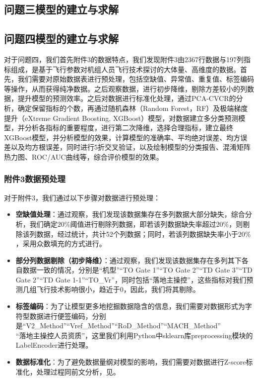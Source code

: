\documentclass{MathorCupModeling}
\begin{document}
	\subsection{问题三模型的建立与求解}

	\subsection{问题四模型的建立与求解}
	对于问题四，我们首先附件3的数据特点，我们发现附件3由2367行数据与197列指标组成，是基于飞行参数对机组人员飞行技术探讨的大体量、高维度的数据。首先，我们需要对原始数据表进行预处理，包括空缺值、异常值、重复值、标签编码等操作，从而获得纯净数据。之后观察数据，进行初步降维，剔除方差较小的列数据，提升模型的预测效率。之后对数据进行标准化处理，通过PCA-CVCR的分析，确定保留指标的个数，再通过随机森林（Random Forest，RF）及极端梯度提升（eXtreme Gradient Boosting, XGBoost）模型，对数据建立多分类预测模型，并分析各指标的重要程度，进行第二次降维，选择合理指标，建立最终XGBoost模型，并分析模型的效果，计算模型的准确率、平均绝对误差、均方误差以及均方根误差，同时进行5折交叉验证，以及绘制模型的分类报告、混淆矩阵热力图、ROC/AUC曲线等，综合评价模型的效果。
	\subsubsection{附件3数据预处理}
	对于附件3，我们通过以下步骤对数据进行预处理：
	\begin{itemize}
		\item \textbf{空缺值处理}：通过观察，我们发现该数据集存在多列数据大部分缺失，综合分析，我们确定$20\%$阈值进行剔除列数据，即若该列数据缺失率超过$20\%$，则剔除该列数据，经过统计，共计52个列数据；同时，若该列数据缺失率小于$20\%$，采用众数填充的方式进行。
		\item \textbf{部分列数据剔除（初步降维）}：通过观察，我们发现该数据集存在多列其下各自数据一致的情况，分别是“机型”“TO Gate 1”“TO Gate 2”“TD Gate 3”“TD Gate 2”“TD Gate 1-1”“TO\_Vr”，同时包括“落地主操控”，这些指标对我们预测几组飞行技术影响很小，趋近于0，因此，我们将其剔除。
		\item \textbf{标签编码}：为了让模型更多地挖掘数据隐含的信息，我们需要对数据形式为字符型数据进行便签编码，分别是“V2\_Method”“Vref\_Method”“RoD\_Method”“MACH\_Method”\\“落地主操控人员资质”，这里我们利用Python中sklearn库preprocessing模块的LabelEncoder进行处理。
		\item \textbf{数据标准化}：为了避免数据量纲对模型的影响，我们需要对数据进行Z-score标准化，处理过程同前文分析，见\textcolor{blue}{}。
	\end{itemize}
\end{document}

